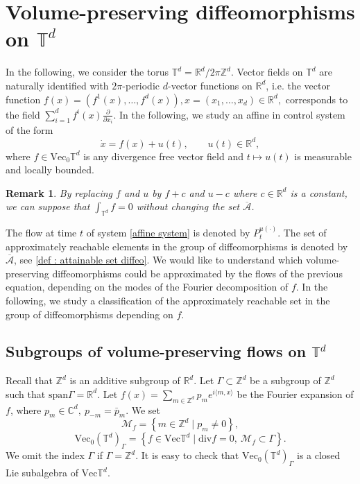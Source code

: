 \documentclass[10pt]{article}
\newcommand{\p}{\partial}
\newcommand{\R}{{\mathbb R}}
\newcommand{\T}{{\mathbb T}}
\newcommand{\Z}{{\mathbb Z}}
\newcommand{\M}{{\mathcal M}}
\newcommand{\ov}{\overline}
\newtheorem{rem}{Remark}
\begin{document}
\section{Volume-preserving diffeomorphisms on $\T^d$}

In the following, we consider the torus $\T^d=\R^d/2\pi\Z^d$. Vector fields on $\T^d$ are naturally identified with $2\pi$-periodic $d$-vector functions on $\R^d$, i.e. the vector function $f(x)=(f^1(x),\ldots,f^d(x)), x=(x_1,\ldots,x_d)\in\R^d,$ corresponds to the field $\sum\limits_{i=1}^df^i(x)\frac\p{\p x_i}$. In the following, we study an affine in control system of the form
\begin{equation} \label{affine system} 
    \dot{x}=f(x)+u(t),  \qquad u(t) \in \R^d, 
\end{equation}
where $f \in \mathrm{Vec}_0 \T^d$ is any divergence free vector field and $t \mapsto u(t)$ is measurable and locally bounded.
\begin{rem}\label{int0}
    By replacing $f$ and $u$ by $f+c$ and $u-c$ where $c\in \R^d$ is a constant, we can suppose that $\int_{\T^d}f=0$ without changing the set $\overline{\mathcal{A}}$.
\end{rem}
The flow at time $t$ of system \eqref{affine system} is denoted by $P^{u(\cdot)}_t$. The set of approximately reachable elements in the group of diffeomorphisms is denoted by $\ov{\mathcal{A}}$, see \cref{def : attainable set diffeo}. We would like to understand which volume-preserving diffeomorphisms could be approximated by the flows of the previous equation, depending on the modes of the Fourier decomposition of $f$. In the following, we study a classification of the approximately reachable set in the group of diffeomorphisms depending on $f$.

\subsection{Subgroups of volume-preserving flows on $\T^d$}

Recall that $\Z^d$ is an additive subgroup of $\R^d$. Let $\Gamma\subset\Z^d$ be a subgroup of $\Z^d$ such that $\mathrm{span}\Gamma=\R^d$. Let $f(x)=\sum\limits_{m\in\Z^d}p_me^{i\langle m,x\rangle}$ be the Fourier expansion of $f$, where $p_m\in \mathbb C^d,\ p_{-m}=\bar p_m$. We set 
$$
\M_f=\left\{m\in\Z^d \mid p_m\neq 0 \right\}, 
$$
$$
\mathrm{Vec}_0(\T^d)_\Gamma=\left\{f\in\mathrm{Vec}\T^d \mid \mathrm{div}f=0,\ \M_f\subset\Gamma\right\}.
$$
We omit the index $\Gamma$ if $\Gamma=\Z^d$.
It is easy to check that $\mathrm{Vec}_0(\T^d)_\Gamma$ is a closed Lie subalgebra of $\mathrm{Vec}\T^d$.
\end{document}
